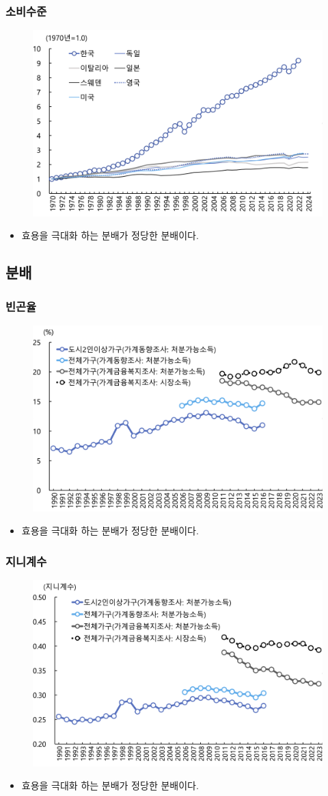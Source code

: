 \documentclass[aspectratio=169,xcolor=dvipsnames,handout]{beamer}
\begin{document}
\begin{frame}[<+->]
\frametitle{소비수준}
    \begin{figure}
        \centering
        \includegraphics[width=.55\textwidth]{pic/fig_ineq_04.png}
    \end{figure}
    \begin{itemize}
        \item 효용을 극대화 하는 분배가 정당한 분배이다.
    \end{itemize}
\end{frame}

\subsection{분배}
\begin{frame}[<+->]
\frametitle{빈곤율}
    \begin{figure}
        \centering
        \includegraphics[width=.55\textwidth]{pic/fig_ineq_07.png}
    \end{figure}
    \begin{itemize}
        \item 효용을 극대화 하는 분배가 정당한 분배이다.
    \end{itemize}
\end{frame}

\begin{frame}[<+->]
\frametitle{지니계수}
    \begin{figure}
        \centering
        \includegraphics[width=.55\textwidth]{pic/fig_ineq_08.png}
    \end{figure}
    \begin{itemize}
        \item 효용을 극대화 하는 분배가 정당한 분배이다.
    \end{itemize}
\end{frame}
\end{document}
